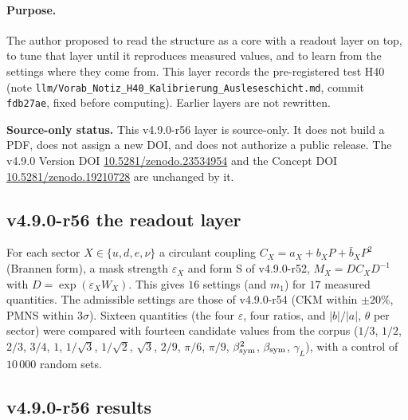 \paragraph{Purpose.}
The author proposed to read the structure as a core with a readout layer on top, to tune that layer until it reproduces measured values, and to learn from
the settings where they come from.  This layer records the pre-registered test H40 (note \texttt{llm/Vorab\_Notiz\_H40\_Kalibrierung\_Ausleseschicht.md},
commit \texttt{fdb27ae}, fixed before computing).  Earlier layers are not rewritten.

\noindent\textbf{Source-only status.}
This v4.9.0-r56 layer is source-only.  It does not build a PDF, does not assign a new DOI,
and does not authorize a public release.  The v4.9.0 Version DOI
\href{https://doi.org/10.5281/zenodo.23534954}{10.5281/zenodo.23534954} and the Concept DOI
\href{https://doi.org/10.5281/zenodo.19210728}{10.5281/zenodo.19210728} are unchanged by it.

\subsection*{v4.9.0-r56 the readout layer}
\label{subsec:v490-r56-layer}

For each sector \(X\in\{u,d,e,\nu\}\) a circulant coupling \(C_X=a_X+b_XP+\bar b_XP^2\) (Brannen form), a mask strength \(\varepsilon_X\) and form S of
v4.9.0-r52, \(M_X=DC_XD^{-1}\) with \(D=\exp(\varepsilon_XW_X)\).  This gives \(16\) settings (and \(m_1\)) for \(17\) measured quantities.  The admissible
settings are those of v4.9.0-r54 (CKM within \(\pm20\%\), PMNS within \(3\sigma\)).  Sixteen quantities (the four \(\varepsilon\), four ratios, and
\(|b|/|a|\), \(\theta\) per sector) were compared with fourteen candidate values from the corpus (\(1/3\), \(1/2\), \(2/3\), \(3/4\), \(1\), \(1/\sqrt3\), \(1/\sqrt2\),
\(\sqrt3\), \(2/9\), \(\pi/6\), \(\pi/9\), \(\beta_{\rm sym}^2\), \(\beta_{\rm sym}\), \(\gamma_L\)), with a control of \(10\,000\) random sets.

\subsection*{v4.9.0-r56 results}
\label{subsec:v490-r56-results}

